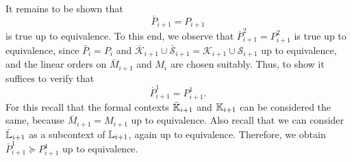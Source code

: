 \begin{Proof}
  It remains to be shown that
  \begin{equation}
    \label{eq:57}
    \bar P_{i+1} = P_{i+1}
  \end{equation}
  is true up to equivalence.  To this end, we observe that $\bar P_{i+1}^{2} =
  P_{i+1}^{2}$ is true up to equivalence, since $\bar P_{i} = P_{i}$ and
  $\bar{\mathcal{K}}_{i+1} \cup \bar{\mathcal{S}}_{i+1} = \mathcal{K}_{i+1} \cup
  \mathcal{S}_{i+1}$ up to equivalence, and the linear orders on $\bar M_{i+1}$ and
  $M_{i}$ are chosen suitably.  Thus, to show  it suffices to verify that
  \begin{equation}
    \label{eq:58}
    \bar P_{i+1}^{1} = P_{i+1}^{1}.
  \end{equation}
  For this recall that the formal contexts $\bar{{\mathbb{K}}}_{i+1}$ and ${\mathbb{K}}_{i+1}$ can be
  considered the same, because $\bar M_{i+1} = M_{i+1}$ up to equivalence.  Also recall
  that we can consider $\bar{{\mathbb{L}}}_{i+1}$ as a subcontext of ${\mathbb{L}}_{i+1}$, again up to
  equivalence.  Therefore, we obtain $\bar P_{i+1}^{1} \succeq P_{i+1}^{1}$ up to
  equivalence.


\end{Proof}
